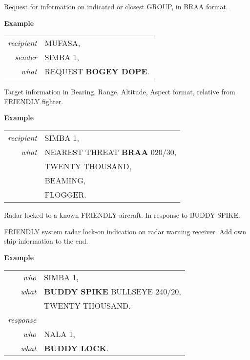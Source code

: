 \begin{tcoloritemize}
    Request for information on indicated or closest GROUP, in BRAA format.

    \medskip
    \textbf{Example}
    \begin{center}
        \begin{tabular}{>{\itshape}r l}
            recipient & MUFASA, \\
            sender & SIMBA 1, \\
            what & REQUEST \textbf{BOGEY DOPE}. \\
        \end{tabular}
    \end{center}

    \blueitem[BRAA] 
    Target information in Bearing, Range, Altitude, Aspect format, relative from FRIENDLY fighter.

    \medskip
    \textbf{Example}
    \begin{center}
        \begin{tabular}{>{\itshape}r l}
            recipient & SIMBA 1, \\
            what & NEAREST THREAT \textbf{BRAA} 020/30, \\
            & TWENTY THOUSAND, \\
            & BEAMING, \\
            & FLOGGER. \\
        \end{tabular}
    \end{center}

    Radar locked to a known FRIENDLY aircraft. In response to BUDDY SPIKE.
    
    FRIENDLY system radar lock-on indication on radar warning receiver. 
    Add own ship information to the end.
    
    \medskip
    \textbf{Example}
    \begin{center}
        \begin{tabular}{>{\itshape}r l}
            who & SIMBA 1, \\
            what & \textbf{BUDDY SPIKE} BULLSEYE 240/20, \\
            & TWENTY THOUSAND. \\
            response \\
            who & NALA 1, \\
            what & \textbf{BUDDY LOCK}. \\
        \end{tabular}
    \end{center}


\end{tcoloritemize}
